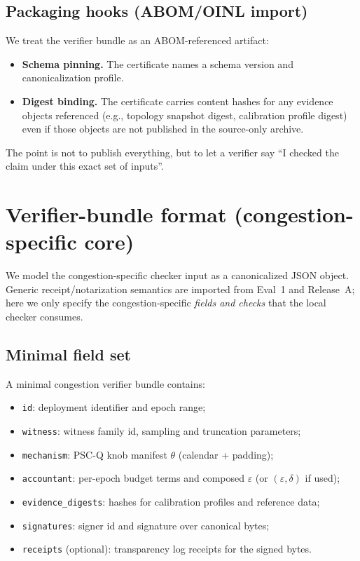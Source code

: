 \documentclass[11pt]{article}
\newcommand{\eps}{\varepsilon}
\begin{document}
\subsection{Packaging hooks (ABOM/OINL import)}
We treat the verifier bundle as an ABOM-referenced artifact:
\begin{itemize}[leftmargin=1.2em]
\item \textbf{Schema pinning.} The certificate names a schema version and canonicalization profile.
\item \textbf{Digest binding.} The certificate carries content hashes for any evidence objects referenced (e.g., topology snapshot digest, calibration profile digest) even if those objects are not published in the source-only archive.
\end{itemize}
The point is not to publish everything, but to let a verifier say ``I checked the claim under this exact set of inputs''.

\section{Verifier-bundle format (congestion-specific core)}
We model the congestion-specific checker input as a canonicalized JSON object.
Generic receipt/notarization semantics are imported from Eval~1 and Release~A; here we only specify the congestion-specific \emph{fields and checks} that the local checker consumes.\cite{series:evalnotary,series:release}

\subsection{Minimal field set}
A minimal congestion verifier bundle contains:
\begin{itemize}[leftmargin=1.2em]
\item \texttt{id}: deployment identifier and epoch range;
\item \texttt{witness}: witness family id, sampling and truncation parameters;
\item \texttt{mechanism}: PSC-Q knob manifest $\theta$ (calendar + padding);
\item \texttt{accountant}: per-epoch budget terms and composed $\eps$ (or $(\eps,\delta)$ if used);
\item \texttt{evidence\_digests}: hashes for calibration profiles and reference data;
\item \texttt{signatures}: signer id and signature over canonical bytes;
\item \texttt{receipts} (optional): transparency log receipts for the signed bytes.
\end{itemize}
\end{document}
